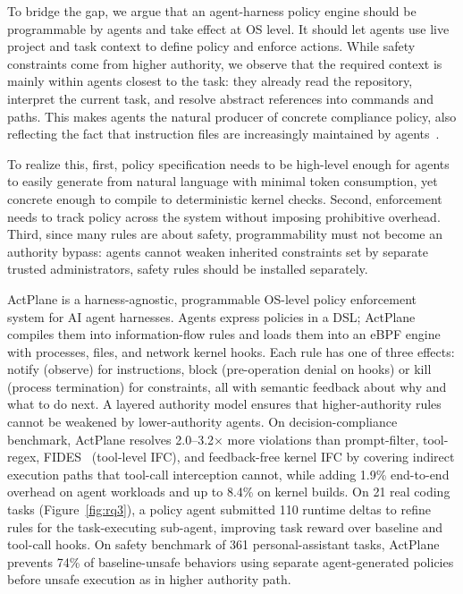 \documentclass[sigplan,10pt]{acmart}
\newcommand{\sys}{ActPlane}
\begin{document}
To bridge the gap, we argue that an agent-harness policy engine
should be programmable by agents and take effect at OS level.
It should let agents
use live project and task context to define policy and
enforce actions. While safety constraints come from
higher authority, we observe that the required context
is mainly within agents
closest to the task: they already read
the repository, interpret the current task, and resolve abstract
references into commands and paths. This makes agents
the natural producer of concrete compliance policy,
also reflecting the fact that instruction files are
increasingly maintained by agents~\cite{anthropic2025claudecode,galster2026configuring}.

To realize this, first, policy specification needs to be
high-level enough for agents to easily generate
from natural language with minimal token consumption,
yet concrete enough to compile to
deterministic kernel checks. Second,
enforcement needs to track
policy across the system without imposing prohibitive
overhead. Third, since many rules are about safety,
programmability must not become an authority bypass: agents
cannot weaken inherited
constraints set by separate
trusted administrators, safety rules should
be installed separately.

\sys{} is a harness-agnostic, programmable
OS-level policy enforcement system for
AI agent harnesses. Agents express policies in a DSL;
\sys{} compiles them into information-flow rules and
loads them into an eBPF engine with processes,
files, and network kernel hooks.
Each rule has one of three effects:
notify (observe) for instructions,
block (pre-operation denial on hooks)
or kill (process
termination) for constraints, all with semantic
feedback about why and what to do next. A layered authority model ensures
that higher-authority
rules cannot be weakened by lower-authority agents.
On decision-compliance benchmark,
\sys{} resolves 2.0--3.2$\times$ more violations
than prompt-filter, tool-regex, FIDES~\cite{costa2025fides}
(tool-level IFC), and feedback-free
kernel IFC by covering
indirect execution paths that tool-call
interception cannot, while
adding 1.9\% end-to-end overhead on agent workloads and up to 8.4\% on
kernel builds. On 21 real coding tasks (Figure~\ref{fig:rq3}),
a policy agent submitted 110 runtime deltas to refine
rules for the task-executing sub-agent, improving
task reward over baseline and tool-call hooks.
On safety benchmark of 361 personal-assistant tasks,
\sys{} prevents 74\% of
baseline-unsafe behaviors
using separate agent-generated
policies before unsafe execution as in higher authority path.
\end{document}
